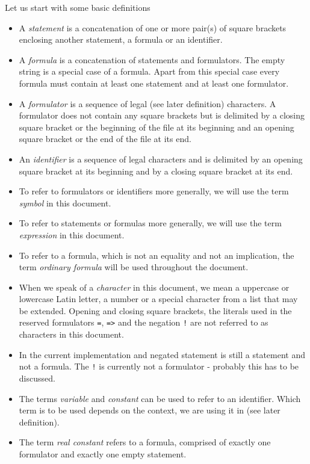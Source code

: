 \documentclass[british]{article}
\newcommand\prv{bc}
\newcommand\m[1]{\texttt{#1}}
\begin{document}
Let us start with some basic definitions
\begin{itemize}
\item A \emph{statement} is a concatenation of one or more pair(s) of square
brackets enclosing another statement, a formula or an identifier.
\item A \emph{formula} is a concatenation of statements and formulators.
The empty string is a special case of a formula. Apart from this special
case every formula must contain at least one statement and at least
one formulator.
\item A \emph{formulator }is a sequence of legal (see later definition)
characters. A formulator does not contain any square brackets but
is delimited by a closing square bracket or the beginning of the file
at its beginning and an opening square bracket or the end of the file
at its end.
\item An \emph{identifier} is a sequence of legal characters and is delimited
by an opening square bracket at its beginning and by a closing square
bracket at its end.
\item To refer to formulators or identifiers more generally, we will use
the term \emph{symbol }in this document.
\item To refer to statements or formulas more generally, we will use the
term \emph{expression }in this document.
\item To refer to a formula, which is not an equality and not an implication, the term \emph{ordinary formula} will be used throughout the document.
\item When we speak of a \emph{character} in this document, we mean a uppercase
or lowercase Latin letter, a number or a special character from a
list that may be extended. Opening and closing square brackets, the
literals used in the reserved formulators \m{=}, \m{=>} and the
negation \m{!} are not referred to as characters in this document.
\item In the current implementation and negated statement is still a statement
and not a formula. The \m{!} is currently not a formulator - probably
this has to be discussed.
\item The terms \emph{variable} and \emph{constant} can be used to refer
to an identifier. Which term is to be used depends on the context,
we are using it in (see later definition).
\item The term \emph{real constant} refers to a formula, comprised of exactly
one formulator and exactly one empty statement.
\end{itemize}
\pagebreak{}
\end{document}
